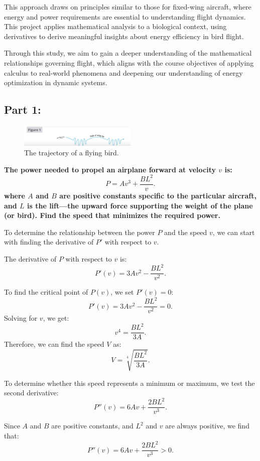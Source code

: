 \documentclass{article}
\begin{document}
This approach draws on principles similar to those for fixed-wing aircraft, where energy and power requirements are essential to understanding flight dynamics. This project applies mathematical analysis to a biological context, using derivatives to derive meaningful insights about energy efficiency in bird flight.

Through this study, we aim to gain a deeper understanding of the mathematical relationships governing flight, which aligns with the course objectives of applying calculus to real-world phenomena and deepening our understanding of energy optimization in dynamic systems.
\newpage


\subsection*{Part 1:}
\begin{figure}[h]
    \centering
    \includegraphics[width=0.5\textwidth]{bird.png}
    \caption{\small The trajectory of a flying bird.}
    \label{fig:bird}
\end{figure}

{\large \bfseries The power needed to propel an airplane forward at velocity \( v \) is: 
}\[
P = Av^3 + \frac{BL^2}{v}.
\]
{\large \bfseries where \( A \) and \( B \) are positive constants specific to the particular aircraft, and \( L \) is the lift—the upward force supporting the weight of the plane (or bird). Find the speed that minimizes the required power.}
\setlength{\parskip}{2em}

To determine the relationship between the power \(P\) and the speed \(v\), we can start with finding the derivative of \(P'\) with respect to \(v\).

The derivative of \( P \) with respect to \( v \) is:
\[
P'(v) = 3Av^2 - \frac{BL^2}{v^2}.
\]

To find the critical point of \( P(v) \), we set \( P'(v) = 0 \):
\[
P'(v) = 3Av^2 - \frac{BL^2}{v^2} = 0.
\]
Solving for \( v \), we get:
\[
v^4 = \frac{BL^2}{3A}.
\]
Therefore, we can find the speed \( V \) as:
\[
V = \sqrt[4]{\frac{BL^2}{3A}}.
\]

To determine whether this speed represents a minimum or maximum, we test the second derivative:
\[
P''(v) = 6Av + \frac{2BL^2}{v^3}.
\]

Since \( A \) and \( B \) are positive constants, and \( L^2 \) and \( v \) are always positive, we find that:
\[
P''(v) = 6Av + \frac{2BL^2}{v^3} > 0.
\]
\end{document}
